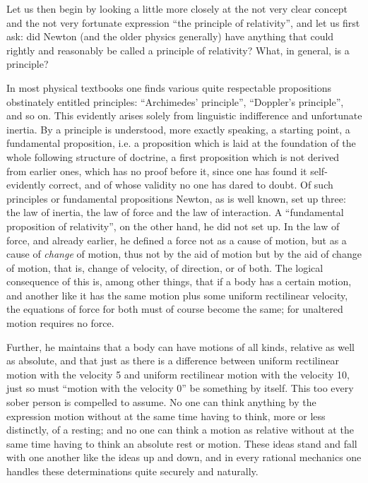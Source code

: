 \documentclass[12pt,a4paper]{article}
\begin{document}
Let us then begin by looking a little more closely at the not very clear
concept and the not very fortunate expression ``the principle of relativity'',
and let us first ask: did Newton (and the older physics generally) have
anything that could rightly and reasonably be called a principle of
relativity? What, in general, is a principle?

In most physical textbooks one finds various quite respectable propositions
obstinately entitled principles: ``Archimedes' principle'', ``Doppler's
principle'', and so on. This evidently arises solely from linguistic
indifference and unfortunate inertia. By a principle is understood, more
exactly speaking, a starting point, a fundamental proposition, i.e. a
proposition which is laid at the foundation of the whole following structure
of doctrine, a first proposition which is not derived from earlier ones, which
has no proof before it, since one has found it self-evidently correct, and of
whose validity no one has dared to doubt. Of such principles or fundamental
propositions Newton, as is well known, set up three: the law of inertia, the
law of force and the law of interaction. A ``fundamental proposition of
relativity'', on the other hand, he did not set up. In the law of force, and
already earlier, he defined a force not as a cause of motion, but as a cause
of \emph{change} of motion, thus not by the aid of motion but by the aid of
change of motion, that is, change of velocity, of direction, or of both. The
logical consequence of this is, among other things, that if a body has a
certain motion, and another like it has the same motion plus some uniform
rectilinear velocity, the equations of force for both must of course become
the same; for unaltered motion requires no force.

Further, he maintains that a body can have motions of all kinds, relative as
well as absolute, and that just as there is a difference between uniform
rectilinear motion with the velocity 5 and uniform rectilinear motion with the
velocity 10, just so must ``motion with the velocity 0'' be something by
itself. This too every sober person is compelled to assume. No one can think
anything by the expression motion without at the same time having to think,
more or less distinctly, of a resting; and no one can think a motion as
relative without at the same time having to think an absolute rest or motion.
These ideas stand and fall with one another like the ideas up and down, and in
every rational mechanics one handles these determinations quite securely and
naturally.
\end{document}
